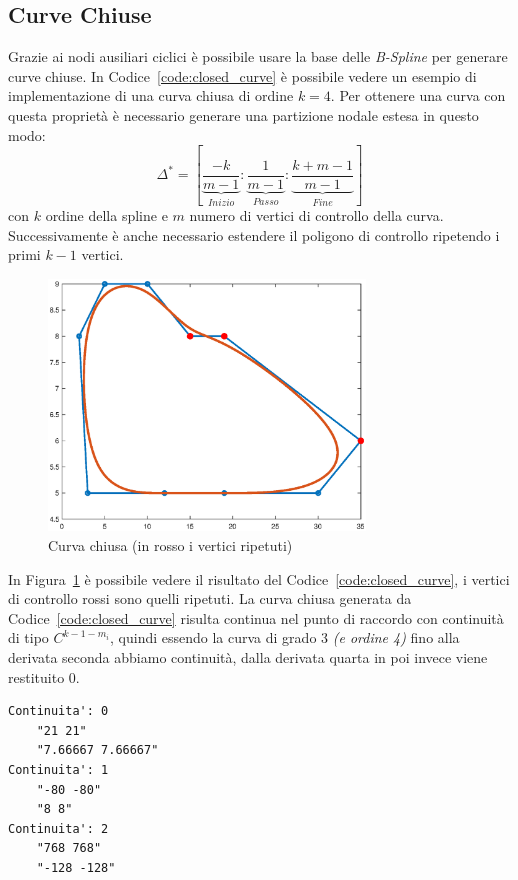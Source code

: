 \documentclass[a4paper, 12pt]{article}
\begin{document}
\subsection{Curve Chiuse}
Grazie ai nodi ausiliari ciclici è possibile usare la base delle \textit{B-Spline} per generare
curve chiuse. In Codice~\ref{code:closed_curve} è possibile vedere un esempio di implementazione di una curva chiusa di 
ordine $k = 4$.
Per ottenere una curva con questa proprietà è necessario generare una partizione nodale estesa in questo modo:
$$\Delta^* = \left[ \underbrace{\frac{-k}{m-1}}_{Inizio} : \underbrace{\frac{1}{m-1}}_{Passo} : \underbrace{\frac{k+m-1}{m-1}}_{Fine} \right]$$
con $k$ ordine della spline e $m$ numero di vertici di controllo della curva.
Successivamente è anche necessario estendere il poligono di controllo ripetendo i primi $k-1$ vertici.

\begin{figure}[]
  \centering
  \includegraphics[width=0.75\textwidth]{figure/closed_curve.eps}
  \caption{Curva chiusa (in rosso i vertici ripetuti)}
  \label{fig:closed_curve}
\end{figure} 
In Figura~\ref{fig:closed_curve} è possibile vedere il risultato del Codice~\ref{code:closed_curve}, i vertici di controllo rossi sono 
quelli ripetuti.
La curva chiusa generata da Codice~\ref{code:closed_curve} risulta continua nel punto di raccordo con continuità di tipo $C^{k-1-m_i}$, quindi 
essendo la curva di grado 3 \textit{(e ordine 4)} fino alla derivata seconda abbiamo continuità, dalla derivata quarta in poi invece viene restituito $0$.
\begin{verbatim}
Continuita': 0
    "21 21"
    "7.66667 7.66667"
Continuita': 1
    "-80 -80"
    "8 8"
Continuita': 2
    "768 768"
    "-128 -128"
\end{verbatim}
\end{document}
